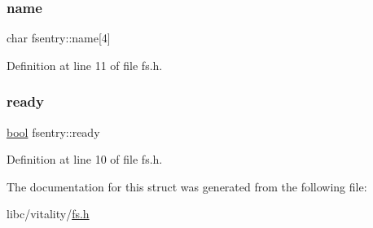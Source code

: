 \mbox{\label{a00242_a9c5a4f5b02eb2c9e9e797f79dc99028a_a9c5a4f5b02eb2c9e9e797f79dc99028a}} 
\subsubsection{\texorpdfstring{name}{name}}
{\footnotesize\ttfamily char fsentry\+::name\mbox{[}4\mbox{]}}



Definition at line 11 of file fs.\+h.

\mbox{\label{a00242_a284522ed97fe1eeebd0fcc039b2ea00a_a284522ed97fe1eeebd0fcc039b2ea00a}} 
\subsubsection{\texorpdfstring{ready}{ready}}
{\footnotesize\ttfamily \hyperlink{a00125_af6a258d8f3ee5206d682d799316314b1_af6a258d8f3ee5206d682d799316314b1}{bool} fsentry\+::ready}



Definition at line 10 of file fs.\+h.



The documentation for this struct was generated from the following file\+:\begin{DoxyCompactItemize}
\item 
libc/vitality/\hyperlink{a00137}{fs.\+h}\end{DoxyCompactItemize}
